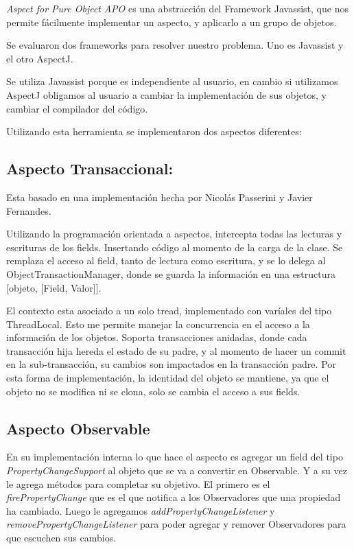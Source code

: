 \bigskip 

\emph{ Aspect for Pure Object} \emph{APO} es una abstracción del Framework
Javassist, que nos permite fácilmente implementar un aspecto, y aplicarlo a un grupo de
objetos.

\bigskip 

Se evaluaron dos frameworks para resolver nuestro problema. Uno es Javassist y
el otro AspectJ. \cite{KiczalesHHKPG01}

\bigskip

Se utiliza Javassist porque es independiente al usuario, en cambio si utilizamos
AspectJ obligamos al usuario a cambiar la implementación de sus objetos,
y cambiar el compilador del código. 

\bigskip

Utilizando esta herramienta se implementaron dos aspectos diferentes:

	\subsection{Aspecto Transaccional:} Esta basado en una implementación
	hecha por Nicolás Passerini y Javier Fernandes.
	 
	Utilizando la programación orientada a aspectos, intercepta todas las lecturas
	y escrituras de los fields. Insertando código al momento de la carga de la 
	clase.
	Se remplaza el acceso al field, tanto de lectura como escritura, y se lo delega
	al ObjectTransactionManager, donde se guarda la información en una estructura
	[objeto, [Field, Valor]].
	
	\bigskip
	
	El contexto esta asociado a un solo tread, implementado con varíales del tipo
	ThreadLocal. Esto me permite manejar la concurrencia en el acceso a la
	información de los objetos. Soporta transacciones anidadas, donde cada
	transacción hija hereda el estado de su padre, y al momento de hacer un commit
	en la sub-transacción, su cambios son impactados en la transacción padre.
	Por esta forma de implementación, la identidad del objeto se mantiene, ya que
	el objeto no se modifica ni se clona, solo se cambia el acceso a sus fields.

	\subsection{ Aspecto Observable}
			
	En su implementación interna lo que hace el aspecto es agregar un field del
	tipo \emph{PropertyChangeSupport} al objeto que se va a convertir en
	Observable. Y a su vez le agrega métodos para completar su objetivo.
	El primero es el \emph{firePropertyChange} que es el que notifica a los
	Observadores que una propiedad ha cambiado.	Luego le agregamos
	\emph{addPropertyChangeListener} y \emph{removePropertyChangeListener} para
	poder agregar y remover Observadores para que escuchen sus cambios.


